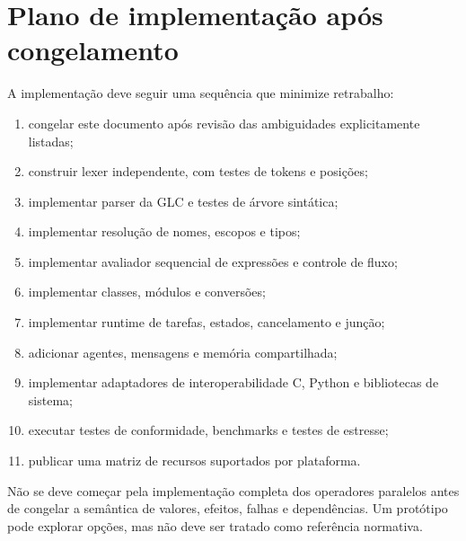\documentclass[12pt,a4paper]{article}
\begin{document}
\section{Plano de implementação após congelamento}
A implementação deve seguir uma sequência que minimize retrabalho:
\begin{enumerate}
\item congelar este documento após revisão das ambiguidades explicitamente listadas;
\item construir lexer independente, com testes de tokens e posições;
\item implementar parser da GLC e testes de árvore sintática;
\item implementar resolução de nomes, escopos e tipos;
\item implementar avaliador sequencial de expressões e controle de fluxo;
\item implementar classes, módulos e conversões;
\item implementar runtime de tarefas, estados, cancelamento e junção;
\item adicionar agentes, mensagens e memória compartilhada;
\item implementar adaptadores de interoperabilidade C, Python e bibliotecas de sistema;
\item executar testes de conformidade, benchmarks e testes de estresse;
\item publicar uma matriz de recursos suportados por plataforma.
\end{enumerate}
Não se deve começar pela implementação completa dos operadores paralelos antes de congelar a semântica de valores, efeitos, falhas e dependências. Um protótipo pode explorar opções, mas não deve ser tratado como referência normativa.
\end{document}
